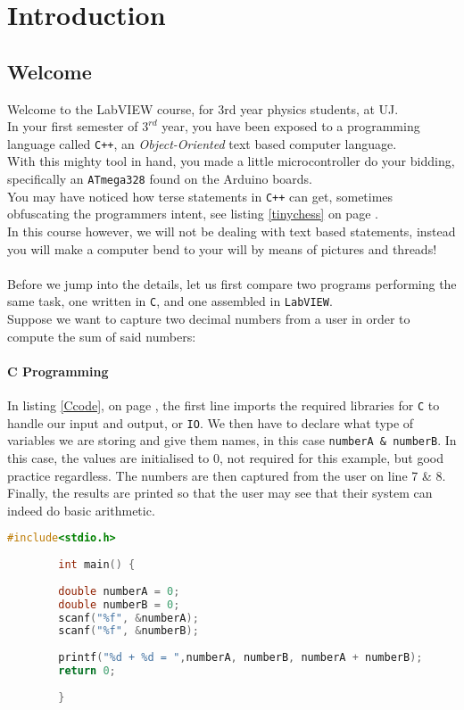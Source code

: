 \chapter{Introduction}

\section{Welcome}
	Welcome to the LabVIEW course, for 3rd year physics students, at UJ.\\
	In your first semester of $3^{rd}$ year, you have been exposed to a programming language called \texttt{C++}, an \textit{Object-Oriented} text based computer language.\\
	With this mighty tool in hand, you made a little microcontroller do your bidding, specifically an \texttt{ATmega328} found on the Arduino boards.\\
	You may have noticed how terse statements in \texttt{C++} can get, sometimes obfuscating the programmers intent, see listing \ref{tinychess} on page \pageref{tinychess}.\\
	In this course however, we will not be dealing with text based statements, instead you will make a computer bend to your will by means of pictures and threads!\\
	\\
	Before we jump into the details, let us first compare two programs performing the same task, one written in \texttt{C}, and one assembled in \texttt{LabVIEW}.\\
	Suppose we want to capture two decimal numbers from a user in order to compute the sum of said numbers:\\
	\subsubsection{C Programming}
	In listing \ref{Ccode}, on page \pageref{Ccode}, the first line imports the required libraries for \texttt{C} to handle our input and output, or \texttt{IO}. We then have to declare what type of variables we are storing and give them names, in this case \texttt{numberA \& numberB}. In this case, the values are initialised to $0$, not required for this example, but good practice regardless. The numbers are then captured from the user on line 7 \& 8. Finally, the results are printed so that the user may see that their system can indeed do basic arithmetic.\\
	{\small
	\begin{lstlisting}[language=C, caption=A simple C program to add two user typed numbers, label=Ccode]
		#include<stdio.h>
		
		int main() {
			
		double numberA = 0;
		double numberB = 0;
		scanf("%f", &numberA);
		scanf("%f", &numberB);
		
		printf("%d + %d = ",numberA, numberB, numberA + numberB);
		return 0;
		
		}
	\end{lstlisting}
	}
